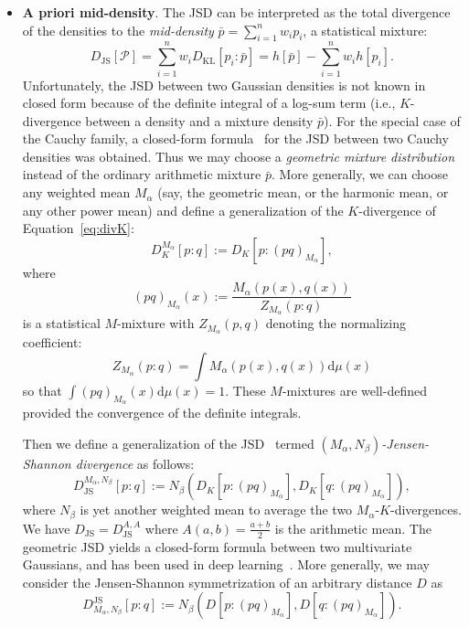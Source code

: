 \documentclass[11pt]{article}
\def\calP{\mathcal{P}}
\def\dmu{\mathrm{d}\mu}
\def\KL{\mathrm{KL}}
\def\JS{\mathrm{JS}}
\begin{document}
\begin{itemize}
	
	\item {\bf A priori mid-density}. The JSD can be interpreted as the total divergence of the densities to the {\em mid-density} $\bar{p}=\sum_{i=1}^n w_i p_i$, a statistical mixture:
	$$
	D_\JS[\calP] = \sum_{i=1}^n w_i D_\KL[p_i:\bar{p}] = h[\bar{p}]-\sum_{i=1}^n w_i h[p_i].
	$$
	Unfortunately, the JSD between two Gaussian densities is not known in closed form because of the definite integral of a log-sum term (i.e., $K$-divergence between a density and a mixture density $\bar{p}$).
	For the special case of the Cauchy family,  a closed-form formula~\citep{CauchyJSD-2021} for the JSD between two Cauchy densities was obtained.
Thus we may choose a {\em geometric mixture distribution}~\citep{JSsym-2019} instead of the ordinary arithmetic mixture $\bar{p}$. More generally, we can choose any weighted mean $M_\alpha$ (say, the geometric mean, or the harmonic mean, or any other power mean) and define a generalization of the $K$-divergence of Equation~\ref{eq:divK}:
	\begin{equation}
	D_K^{M_\alpha}[p:q] := D_K[p:(pq)_{M_\alpha}],
	\end{equation}
	where 
	$$
	(pq)_{M_\alpha}(x):=\frac{M_\alpha(p(x),q(x))}{Z_{M_\alpha}(p:q)}
	$$
	 is a statistical $M$-mixture with $Z_{M_\alpha}(p,q)$
	denoting the normalizing coefficient:
	$$
	Z_{M_\alpha}(p:q)=\int M_\alpha(p(x),q(x))\dmu(x)
	$$ 
	so that $\int (pq)_{M_\alpha}(x)\dmu(x)=1$.
	These $M$-mixtures are well-defined provided the convergence of the definite integrals.
	
	Then we define a generalization of the JSD~\citep{JSsym-2019} termed {\em $(M_\alpha,N_\beta)$-Jensen-Shannon divergence} as follows:
		\begin{equation}
	D_\JS^{M_\alpha,N_\beta}[p:q ]:= N_\beta\left(D_K[p:(pq)_{M_\alpha}] , D_K[q:(pq)_{M_\alpha}]\right),
	\end{equation}
	where $N_\beta$ is yet another weighted mean to average the two $M_\alpha$-$K$-divergences. 
	We have $D_\JS=D_\JS^{A,A}$ where $A(a,b)=\frac{a+b}{2}$ is the arithmetic mean.
	The geometric JSD yields a closed-form formula between two multivariate Gaussians, and has been used in deep learning~\citep{VIGJSD-2020}.
		More generally, we may consider the Jensen-Shannon symmetrization of an arbitrary distance $D$ as  
			\begin{equation}
	D^\JS_{M_\alpha,N_\beta}[p:q]:= N_\beta\left(D[p:(pq)_{M_\alpha}],D[q:(pq)_{M_\alpha}]\right).
	\end{equation}
	

\end{itemize}
\end{document}

